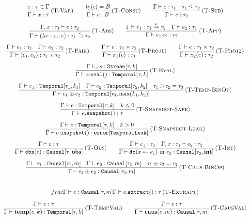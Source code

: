 \documentclass[11pt,a4paper]{article}
\theoremstyle{definition}
\theoremstyle{plain}
\newcommand{\ty}[1]{\texttt{#1}}
\newcommand{\sub}{\le}
\newcommand{\Temp}{\ty{Temporal}}
\newcommand{\Stream}{\ty{Stream}}
\newcommand{\Caus}{\ty{Causal}}
\begin{document}
\begin{gather}
\frac{x : \tau \in \Gamma}{\Gamma \vdash x : \tau} \, (\textsc{T-Var}) \qquad
\frac{\text{ty}(c) = B}{\Gamma \vdash c : B} \, (\textsc{T-Const}) \qquad
\frac{\Gamma \vdash e : \tau_1 \quad \tau_1 \sub \tau_2}{\Gamma \vdash e : \tau_2} \, (\textsc{T-Sub}) \\[6pt]
\frac{\Gamma, x : \tau_1 \vdash e : \tau_2}{\Gamma \vdash (\lambda x:\tau_1.\, e) : \tau_1 \xrightarrow{\epsilon} \tau_2} \, (\textsc{T-Abs}) \qquad
\frac{\Gamma \vdash e_1 : \tau_1 \xrightarrow{\epsilon} \tau_2 \quad \Gamma \vdash e_2 : \tau_1}{\Gamma \vdash e_1\, e_2 : \tau_2} \, (\textsc{T-App}) \\[6pt]
\frac{\Gamma \vdash e_1 : \tau_1 \quad \Gamma \vdash e_2 : \tau_2}{\Gamma \vdash (e_1, e_2) : \tau_1 \times \tau_2} \, (\textsc{T-Pair}) \qquad
\frac{\Gamma \vdash e : \tau_1 \times \tau_2}{\Gamma \vdash \pi_1(e) : \tau_1} \, (\textsc{T-Proj1}) \qquad
\frac{\Gamma \vdash e : \tau_1 \times \tau_2}{\Gamma \vdash \pi_2(e) : \tau_2} \, (\textsc{T-Proj2}) \\[6pt]
\frac{\Gamma \vdash_s s : \Stream[\tau, k]}{\Gamma \vdash s.\ty{eval}() : \Temp[\tau, k]} \, (\textsc{T-Eval}) \\[6pt]
\frac{\Gamma \vdash e_1 : \Temp[\tau_1, k_1] \quad \Gamma \vdash e_2 : \Temp[\tau_2, k_2] \quad \tau_1 \oplus \tau_2 = \tau_3}{\Gamma \vdash e_1 \oplus e_2 : \Temp[\tau_3, \max(k_1, k_2)]} \, (\textsc{T-Temp-BinOp}) \\[6pt]
\frac{\Gamma \vdash e : \Temp[\tau, k] \quad k \le 0}{\Gamma \vdash e.\ty{snapshot}() : \tau} \, (\textsc{T-Snapshot-Safe}) \\[6pt]
\frac{\Gamma \vdash e : \Temp[\tau, k] \quad k > 0}{\Gamma \vdash e.\ty{snapshot}() : \textbf{error}[\ty{TemporalLeak}]} \, (\textsc{T-Snapshot-Leak}) \\[6pt]
\frac{\Gamma \vdash e : \tau}{\Gamma \vdash \ty{obs}(e) : \Caus[\tau, \mathbf{obs}]} \, (\textsc{T-Obs}) \qquad
\frac{\Gamma \vdash e_1 : \tau_1 \quad \Gamma, x : \tau_1 \vdash e_2 : \tau_2}{\Gamma \vdash \ty{do}(x \gets e_1) \text{ in } e_2 : \Caus[\tau_2, \mathbf{int}]} \, (\textsc{T-Int}) \\[6pt]
\frac{\Gamma \vdash e_1 : \Caus[\tau_1, m] \quad \Gamma \vdash e_2 : \Caus[\tau_2, m] \quad \tau_1 \oplus \tau_2 = \tau_3}{\Gamma \vdash e_1 \oplus e_2 : \Caus[\tau_3, m]} \, (\textsc{T-Caus-BinOp}) \\[6pt]
\\frac{\Gamma \vdash e : \Caus[\tau, m]}{\Gamma \vdash e.\ty{extract}() : \tau} \, (\textsc{T-Extract}) \\[6pt]
\frac{\Gamma \vdash e : \tau}{\Gamma \vdash \mathbf{temp}(e, k) : \Temp[\tau, k]} \, (\textsc{T-TempVal}) \qquad
\frac{\Gamma \vdash e : \tau}{\Gamma \vdash \mathbf{caus}(e, m) : \Caus[\tau, m]} \, (\textsc{T-CausVal})
\end{gather}
\end{document}
